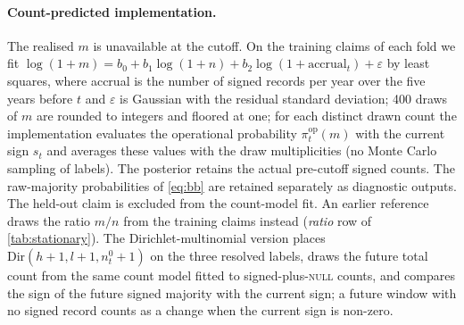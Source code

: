 \documentclass[11pt]{article}
\begin{document}
\paragraph{Count-predicted implementation.} The realised $m$ is unavailable at the cutoff. On the
training claims of each fold we fit $\log(1+m)=b_0+b_1\log(1+n)+b_2\log(1+\text{accrual}_t)+\varepsilon$
by least squares, where accrual is the number of signed records per year over the five years before
$t$ and $\varepsilon$ is Gaussian with the residual standard deviation; 400 draws of $m$ are
rounded to integers and floored at one; for each distinct drawn count the implementation evaluates
the operational probability $\pi^{\mathrm{op}}_t(m)$ with the current sign $s_t$ and averages these
values with the draw multiplicities (no Monte Carlo sampling of labels). The posterior retains the
actual pre-cutoff signed counts. The raw-majority probabilities of \cref{eq:bb} are retained
separately as diagnostic outputs.
The held-out claim is excluded from the count-model fit. An earlier reference draws the ratio $m/n$
from the training claims instead (\emph{ratio} row of \cref{tab:stationary}). The
Dirichlet-multinomial version places $\mathrm{Dir}(h+1,l+1,n^{0}_t+1)$ on the three resolved
labels, draws the future total count from the same count model fitted to signed-plus-\textsc{null}
counts, and compares the sign of the future signed majority with the current sign; a future window
with no signed record counts as a change when the current sign is non-zero.
\end{document}
